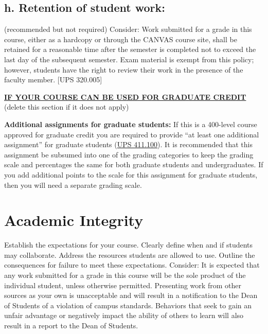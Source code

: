 \documentclass[12pt]{article}
\begin{document}
\subsection*{h. Retention of student work:} {\color{annotationblue}(recommended but not required)}
{\color{suggestionred}Consider: Work submitted for a grade in this course, either as a hardcopy or through the CANVAS course site, shall be retained for a reasonable time after the semester is completed not to exceed the last day of the subsequent semester. Exam material is exempt from this policy; however, students have the right to review their work in the presence of the faculty member. [UPS 320.005]}

\textbf{\uline{IF YOUR COURSE CAN BE USED FOR GRADUATE CREDIT}} {\color{annotationblue}(delete this section if it does not apply)}

\textbf{Additional assignments for graduate students:} {\color{annotationblue}If this is a 400-level course approved for graduate credit you are required to provide ``at least one additional assignment'' for graduate students (\href{https://www.fullerton.edu/senate/publications_policies_resolutions/ups/UPS\%20400/UPS\%20411.100.pdf}{UPS 411.100}). It is recommended that this assignment be subsumed into one of the grading categories to keep the grading scale and percentages the same for both graduate students and undergraduates. If you add additional points to the scale for this assignment for graduate students, then you will need a separate grading scale.}

\section{Academic Integrity}

{\color{annotationblue}Establish the expectations for your course. Clearly define when and if students may collaborate. Address the resources students are allowed to use. Outline the consequences for failure to meet these expectations.} {\color{suggestionred}Consider: It is expected that any work submitted for a grade in this course will be the sole product of the individual student, unless otherwise permitted. Presenting work from other sources as your own is unacceptable and will result in a notification to the Dean of Students of a violation of campus standards. Behaviors that seek to gain an unfair advantage or negatively impact the ability of others to learn will also result in a report to the Dean of Students.}
\end{document}
